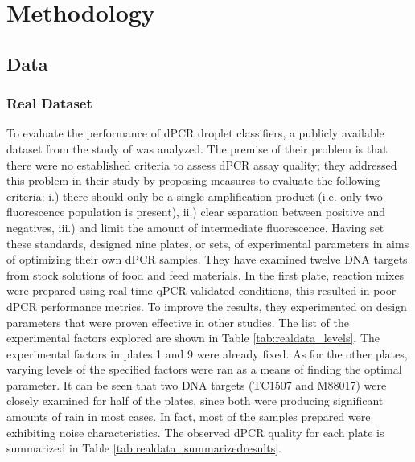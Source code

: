 \chapter{Methodology}
\label{sec:methodology} 

\section{Data}
\label{sec:data}

\subsection{Real Dataset}
\label{sec:ch4_realdata}
To evaluate the performance of dPCR droplet classifiers, a publicly available dataset from the study of  was analyzed. The premise of their problem is that there were no established criteria to assess dPCR assay quality; they addressed this problem in their study by proposing measures to evaluate the following criteria: i.) there should only be a single amplification product (i.e. only two fluorescence population is present), ii.) clear separation between positive and negatives, iii.) and limit the amount of intermediate fluorescence. Having set these standards,  designed nine plates, or sets, of experimental parameters in aims of optimizing their own dPCR samples. They have examined twelve DNA targets from stock solutions of food and feed materials. In the first plate, reaction mixes were prepared using real-time qPCR validated conditions, this resulted in poor dPCR performance metrics. To improve the results, they experimented on design parameters that were proven effective in other studies. The list of the experimental factors explored are shown in Table \ref{tab:realdata_levels}. The experimental factors in plates 1 and 9 were already fixed. As for the other plates, varying levels of the specified factors were ran as a means of finding the optimal parameter. It can be seen that two DNA targets (TC1507 and M88017) were closely examined for half of the plates, since both were producing significant amounts of rain in most cases. In fact, most of the samples prepared were exhibiting noise characteristics. The observed dPCR quality for each plate is summarized in Table \ref{tab:realdata_summarizedresults}.  

